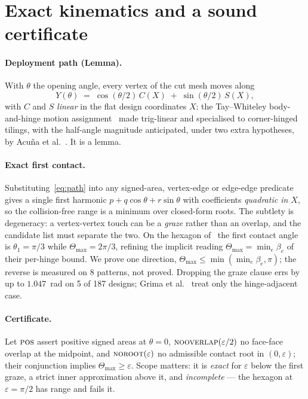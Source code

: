 \documentclass[sigconf,screen]{acmart}
\begin{document}
\section{Exact kinematics and a sound certificate}

\paragraph{Deployment path (Lemma).} With $\theta$ the opening angle, every vertex
of the cut mesh moves along
\begin{equation}
  Y(\theta) \;=\; \cos(\theta/2)\,C(X) \;+\; \sin(\theta/2)\,S(X),
  \label{eq:path}
\end{equation}
with $C$ and $S$ \emph{linear} in the flat design coordinates $X$: the
Tay--Whiteley body-and-hinge motion assignment~\cite{Katoh2009} made trig-linear
and specialised to corner-hinged tilings, with the half-angle magnitude
anticipated, under two extra hypotheses, by Acu\~na et al.~\cite{Acuna2022}. It is
a lemma.

\paragraph{Exact first contact.} Substituting~\eqref{eq:path} into any
signed-area, vertex-edge or edge-edge predicate gives a single first harmonic
$p+q\cos\theta+r\sin\theta$ with coefficients \emph{quadratic in $X$}, so the
collision-free range is a minimum over closed-form roots. The subtlety is
degeneracy: a vertex-vertex touch can be a \emph{graze} rather than an
overlap, and the candidate list must separate the two. On the hexagon
of~\cite{Segall2026} the first contact angle is $\theta_1=\pi/3$ while
$\Theta_{\max}=2\pi/3$, refining the implicit reading
$\Theta_{\max}=\min_e\beta_e$ of their per-hinge bound. We prove one
direction, $\Theta_{\max}\le\min(\min_e\beta_e,\pi)$; the reverse is measured on 8
patterns, not proved. Dropping the graze clause errs by up to $1.047$~rad on 5
of 187 designs; Grima et al.~\cite{Grima2012} treat only the hinge-adjacent case.

\paragraph{Certificate.} Let $\textsc{pos}$ assert positive signed areas at
$\theta=0$, $\textsc{nooverlap}(\varepsilon/2)$ no face-face overlap at the
midpoint, and $\textsc{noroot}(\varepsilon)$ no admissible contact root in
$(0,\varepsilon)$; their conjunction implies $\Theta_{\max}\ge\varepsilon$. Scope
matters: it is \emph{exact} for $\varepsilon$ below the first graze, a strict
inner approximation above it, and \emph{incomplete} --- the hexagon at
$\varepsilon=\pi/2$ has range and fails it.
\end{document}
